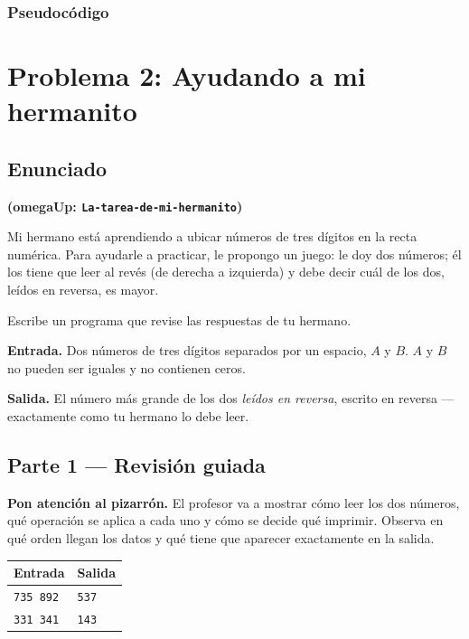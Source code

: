 \documentclass[12pt, oneside]{article}
\begin{document}
\subsubsection{Pseudocódigo}

\vspace{5cm}

\newpage

\section{Problema 2: Ayudando a mi hermanito}

\subsection{Enunciado}

\textbf{(omegaUp: \texttt{La-tarea-de-mi-hermanito})}

Mi hermano está aprendiendo a ubicar números de tres dígitos en la recta
numérica.  Para ayudarle a practicar, le propongo un juego: le doy dos
números; él los tiene que leer al revés (de derecha a izquierda) y debe
decir cuál de los dos, leídos en reversa, es mayor.

Escribe un programa que revise las respuestas de tu hermano.

\textbf{Entrada.}
Dos números de tres dígitos separados por un espacio, $A$ y $B$.
$A$ y $B$ no pueden ser iguales y no contienen ceros.

\textbf{Salida.}
El número más grande de los dos \textit{leídos en reversa}, escrito en
reversa — exactamente como tu hermano lo debe leer.

\subsection{Parte 1 — Revisión guiada}

\begin{advertencia}
  \textbf{Pon atención al pizarrón.}  El profesor va a mostrar cómo
  leer los dos números, qué operación se aplica a cada uno y cómo se
  decide qué imprimir.  Observa en qué orden llegan los datos y qué
  tiene que aparecer exactamente en la salida.
\end{advertencia}

\begin{center}
\begin{tabular}{ll}
  \toprule
  \textbf{Entrada} & \textbf{Salida} \\
  \midrule
  \texttt{735 892} & \texttt{537} \\
  \texttt{331 341} & \texttt{143} \\
  \bottomrule
\end{tabular}
\end{center}
\end{document}
